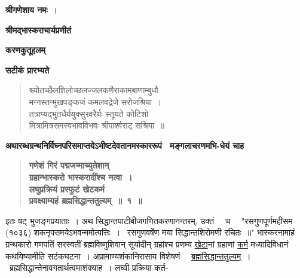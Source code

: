 \documentclass[11pt, openany]{book}
\makeatletter
\newcommand{\devanagarinumeral}[1]{%
	\devanagaridigits{\number \csname c@#1\endcsname}} %
\makeatother
\begin{document}
\thispagestyle{empty}

\begin{center}
\textbf{श्रीगणेशाय नमः}~।
\vspace{3mm}

{\Large\textbf{श्रीमद्भास्कराचार्यप्रणीतं}}
\vspace{5mm}

{\Huge\textbf{करणकुतूहलम्}}
\vspace{5mm}

{\large\textbf{सटीकं प्रारभ्यते}}
\end{center}
\vspace{3mm}

\begin{quote}
{\color{violet}श्च्योतच्छैलशिलोच्छलज्जलकणैराकामबाणाम्बुधौ\\
मग्नस्तन्मुखपङ्कजं कमलवद्रेजे सरोजश्रिया~।\\
तत्राप्यद्भुतधैर्ययुक्सुरवरैर्यः स्तूयते कोटिशो\\
मित्रामित्रसमस्वभावविभवः श्रीपार्श्वराट् सश्रिया~॥}
\end{quote}

{\small \textbf{अथारब्धग्रन्थनिर्विघ्नपरिसमाप्तयेऽभीष्टदेवतानमस्काररूपं ~मङ्गलाचरणमभि-धेयं चाह \textendash }}

 \label{1.1}
\begin{quote}
{\large \textbf{{\color{purple}गणेशं गिरं पद्मजन्माच्युतेशान्\\ 
ग्रहान्भास्करो भास्करादींश्च नत्वा~।\\ 
लघुप्रक्रियं प्रस्फुटं खेटकर्म \\
प्रवक्ष्याम्यहं ब्रह्मसिद्धान्ततुल्यम्~॥~१~॥}}}
\end{quote}

इतः षट् भुजङ्गप्रयाताः~। अथ सिद्धान्तपाटीबीजगणितकरणानन्तरम्, उक्तं ~~च ~~"{\color{violet}रसगुणपूर्णमहीसम\textendash \,(१०३६)\,\textendash \,शकनृपसमयेऽभवन्ममोत्पत्तिः~। ~रसगुणवर्षेण मया सिद्धान्तशिरोमणी रचितः~॥}" भास्करनामाहं ग्रन्थकारो गणपतिं सरस्वतीं ब्रह्मविष्णुशिवान् सूर्यादीन् ग्रहांश्च प्रणम्य \hyperref[1.1]{खेटा}नां ग्रहाणां \hyperref[1.1]{कर्म} मध्यादिविधानं कथयिष्यामीति सटंकघटना~। अप्रामाण्यशंकानिरासाय विशेषणं ~~\hyperref[1.1]{ब्रह्मसिद्धान्ततुल्यम्}~। ~ब्रह्मसिद्धान्तेनावगतार्थत्वमाशंक्याह~। लघ्वी प्रक्रिया कर्त-

\afterpage{\fancyhead[LE,RO]{({\small{\thepage}})}}
\cfoot{}
\newpage
\renewcommand{\thepage}{\devanagarinumeral{page}}
\setcounter{page}{2}
\end{document}
